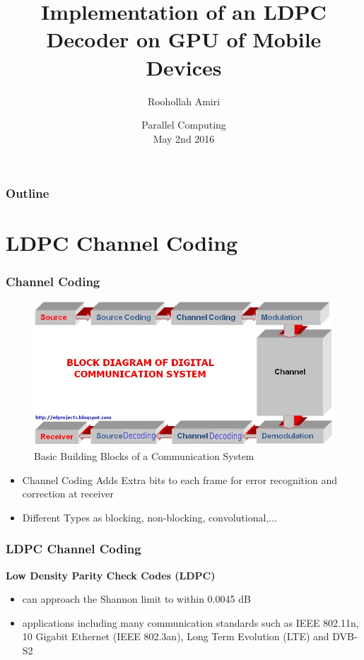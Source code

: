 \documentclass{beamer}
\title[LDPC GPU Decoder]{
  Implementation of an LDPC Decoder on GPU of Mobile Devices}
\author[Roohollah Amiri]{
  Roohollah Amiri\\\medskip
 }
\institute[Boise State University]{
  Department of Electrical and Computer and Engineering \\
  Boise State University}
\date[Parallel Computing 2016]{
  Parallel Computing\\
  May 2nd 2016}
\begin{document}
\begin{frame}
  \titlepage
\end{frame}

\begin{frame}
  \frametitle{Outline}

  \tableofcontents
\end{frame}

\section{LDPC Channel Coding}
\begin{frame}
  \frametitle{Channel Coding}

\begin{figure}[h]
\begin{centering}
\includegraphics[scale=0.3]{img/Communication-System-1.png}
\caption[width=.3\textwidth]{Basic Building Blocks of a Communication System}
\end{centering}
\end{figure}
    \begin{itemize}
    \item Channel Coding Adds Extra bits to each frame for error recognition and correction at receiver
    \item Different Types as blocking, non-blocking, convolutional,...
  \end{itemize}
\end{frame}
\begin{frame}
  \frametitle{LDPC Channel Coding}
  \textbf{Low Density Parity Check Codes (LDPC)}
   \begin{itemize}
    \item can approach the Shannon limit to within 0.0045 dB
    \item applications including many communication standards such as IEEE 802.11n, 10 Gigabit Ethernet (IEEE 802.3an), Long Term Evolution (LTE) and DVB-S2
   \end{itemize}     
\end{frame}
\end{document}

